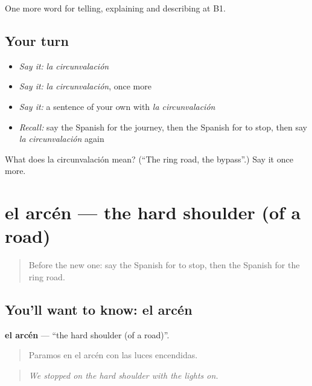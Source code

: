\begin{grammarlens}[title={What you've built}]
One more word for telling, explaining and describing at B1.
\end{grammarlens}

\subsection*{Your turn}
\begin{itemize}
\raggedright
  \item \emph{Say it:} \emph{la circunvalación}
  \item \emph{Say it:} \emph{la circunvalación}, once more
  \item \emph{Say it:} a sentence of your own with \emph{la circunvalación}
  \item \emph{Recall:} say the Spanish for the journey, then the Spanish for to stop, then say \emph{la circunvalación} again
\end{itemize}

\begin{tcolorbox}[breakable,colback=teal!4,colframe=teal!35!black,title={Before you move on}]
What does la circunvalación mean? (\textquotedblleft{}The ring road, the bypass\textquotedblright{}.) Say it once more.
\end{tcolorbox}
\section[el arcén]{el arcén — the hard shoulder (of a road)}

\label{lesson:ES-C642-arcen}



\begin{quote}
Before the new one: say the Spanish for to stop, then the Spanish for the ring road.
\end{quote}

\subsection*{You'll want to know: el arcén}
\textbf{el arcén} — \textquotedblleft{}the hard shoulder (of a road)\textquotedblright{}.

\begin{quote}
Paramos en el arcén con las luces encendidas.
\end{quote}

\begin{quote}
\emph{We stopped on the hard shoulder with the lights on.}
\end{quote}

